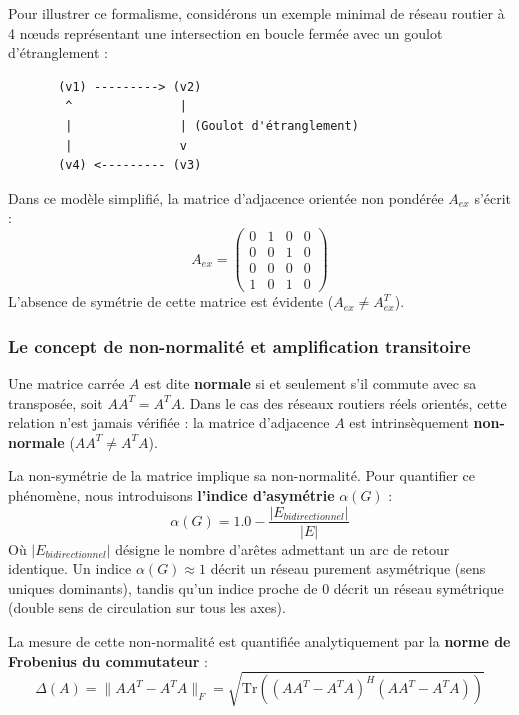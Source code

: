 \documentclass[10pt, a4paper]{article}
\begin{document}
Pour illustrer ce formalisme, considérons un exemple minimal de réseau
routier à 4 nœuds représentant une intersection en boucle fermée avec un
goulot d'étranglement :

\begin{verbatim}
       (v1) ---------> (v2)
        ^               |
        |               | (Goulot d'étranglement)
        |               v
       (v4) <--------- (v3)
\end{verbatim}

Dans ce modèle simplifié, la matrice d'adjacence orientée non pondérée
\(A_{ex}\) s'écrit : \[A_{ex} = \begin{pmatrix}
0 & 1 & 0 & 0 \\
0 & 0 & 1 & 0 \\
0 & 0 & 0 & 0 \\
1 & 0 & 1 & 0
\end{pmatrix}\] L'absence de symétrie de cette matrice est évidente
(\(A_{ex} \neq A_{ex}^T\)).

\subsubsection{Le concept de non-normalité et amplification
transitoire}\label{le-concept-de-non-normalituxe9-et-amplification-transitoire}

Une matrice carrée \(A\) est dite \textbf{normale} si et seulement s'il
commute avec sa transposée, soit \(A A^T = A^T A\). Dans le cas des
réseaux routiers réels orientés, cette relation n'est jamais vérifiée :
la matrice d'adjacence \(A\) est intrinsèquement \textbf{non-normale}
(\(A A^T \neq A^T A\)).

La non-symétrie de la matrice implique sa non-normalité. Pour quantifier
ce phénomène, nous introduisons \textbf{l'indice d'asymétrie}
\(\alpha(G)\) : \[\alpha(G) = 1.0 - \frac{|E_{bidirectionnel}|}{|E|}\]
Où \(|E_{bidirectionnel}|\) désigne le nombre d'arêtes admettant un arc
de retour identique. Un indice \(\alpha(G) \approx 1\) décrit un réseau
purement asymétrique (sens uniques dominants), tandis qu'un indice
proche de 0 décrit un réseau symétrique (double sens de circulation sur
tous les axes).

La mesure de cette non-normalité est quantifiée analytiquement par la
\textbf{norme de Frobenius du commutateur} :
\[\Delta(A) = \| A A^T - A^T A \|_F = \sqrt{\text{Tr}\left( (A A^T - A^T A)^H (A A^T - A^T A) \right)}\]
\end{document}
